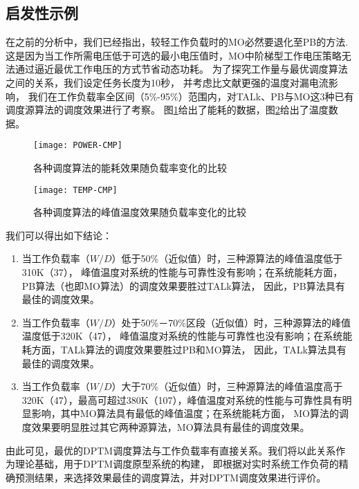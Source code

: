 \subsection{启发性示例}
在之前的分析中，我们已经指出，较轻工作负载时的MO必然要退化至PB的方法. 这是因为当工作所需电压低于可选的最小电压值时，MO中阶梯型工作电压策略无法通过逼近最优工作电压的方式节省动态功耗。 为了探究工作量与最优调度算法之间的关系，我们设定任务长度为10秒， 并考虑比文献更强的温度对漏电流影响， 我们在工作负载率全区间（5\%-95\%）范围内，对TALk、PB与MO这3种已有调度源算法的调度效果进行了考察。 图\ref{fig:exp-power-cmp}给出了能耗的数据，图\ref{fig:exp-temp-cmp}给出了温度数据。
\begin{figure}%
  \centering
  \texttt{[image: POWER-CMP]}
  \caption{各种调度算法的能耗效果随负载率变化的比较}
  \label{fig:exp-power-cmp}
\end{figure}
\begin{figure}%
  \centering
  \texttt{[image: TEMP-CMP]}
  \caption{各种调度算法的峰值温度效果随负载率变化的比较}
  \label{fig:exp-temp-cmp}
\end{figure}

我们可以得出如下结论：
\begin{enumerate}[1)]
\item 当工作负载率（$W/D$）低于50\%（近似值）时，三种源算法的峰值温度低于310K（37\celsius）， 峰值温度对系统的性能与可靠性没有影响；在系统能耗方面，PB算法（也即MO算法）的调度效果要胜过TALk算法， 因此，PB算法具有最佳的调度效果。
\item 当工作负载率（$W/D$）处于50\%－70\%区段（近似值）时，三种源算法的峰值温度低于320K（47\celsius）， 峰值温度对系统的性能与可靠性也没有影响；在系统能耗方面，TALk算法的调度效果要胜过PB和MO算法， 因此，TALk算法具有最佳的调度效果。
\item 当工作负载率（$W/D$）大于70\%（近似值）时，三种源算法的峰值温度高于320K（47\celsius ），最高可超过380K（107\celsius ），峰值温度对系统的性能与可靠性具有明显影响，其中MO算法具有最低的峰值温度；在系统能耗方面， MO算法的调度效果要明显胜过其它两种源算法，MO算法具有最佳的调度效果。
\end{enumerate}

由此可见，最优的DPTM调度算法与工作负载率有直接关系。我们将以此关系作为理论基础，用于DPTM调度原型系统的构建， 即根据对实时系统工作负荷的精确预测结果，来选择效果最佳的调度算法，并对DPTM调度效果进行评价。

